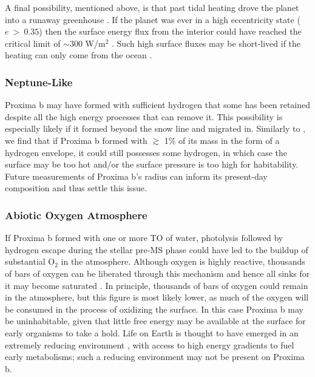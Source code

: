 \documentclass[preprint,12pt]{aastex}
\begin{document}
A final possibility, mentioned above, is that past tidal heating drove
the planet into a runaway greenhouse \citep{Barnes13}. If the planet
was ever in a high eccentricity state ($e~>~0.35$) then the surface
energy flux from the interior could have reached the critical limit of
$\sim$300 W/m$^2$ \citep{Kasting93,Abe93,Goldblatt15}. Such high
surface fluxes may be short-lived if the heating can only come from
the ocean \citep{DriscollBarnes15}.

\subsubsection{Neptune-Like}
\label{sec:results:atmstates:neptunelike}

Proxima b may have formed with sufficient hydrogen that some has been
retained despite all the high energy processes that can remove
it. This possibility is especially likely if it formed beyond the snow
line and migrated in. Similarly to \cite{OwenMohanty16}, we find that
if Proxima b formed with $\gtrsim$ 1\% of its mass in the form of a
hydrogen envelope, it could still possesses some hydrogen, in which
case the surface may be too hot and/or the surface pressure is too
high for habitability.  Future measurements of Proxima b's radius can
inform its present-day composition and thus settle this issue.

\subsubsection{Abiotic Oxygen Atmosphere}
\label{sec:results:atmstates:o2atmos}

If Proxima b formed with one or more TO of water, photolysis followed
by hydrogen escape during the stellar pre-MS phase could have led to
the buildup of substantial O$_2$ in the atmosphere. Although oxygen is
highly reactive, thousands of bars of oxygen can be liberated through
this mechanism \citep{LugerBarnes15} and hence all sinks for it may
become saturated \citep{Schaefer16}. In principle, thousands of bars
of oxygen could remain in the atmosphere, but this figure is most
likely lower, as much of the oxygen will be consumed in the process of
oxidizing the surface.  In this case Proxima b may be uninhabitable,
given that little free energy may be available at the surface for
early organisms to take a hold. Life on Earth is thought to have
emerged in an extremely reducing environment \citep{Oparin24,
  Haldane29}, with access to high energy gradients to fuel early
metabolisms; such a reducing environment may not be present on Proxima b.
\end{document}
